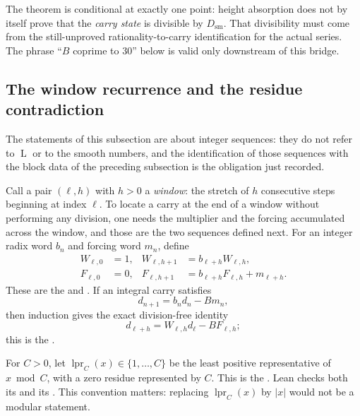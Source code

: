 \documentclass[11pt]{article}
\newcommand{\Lprefix}{\operatorname{L}}
\begin{document}
\noindent The theorem is conditional at exactly one point: height absorption
does not by itself prove that the \emph{carry state} is divisible by
$D_{\mathrm{sm}}$.  That divisibility must come from the still-unproved
rationality-to-carry identification for the actual series.  The phrase
``$B$ coprime to $30$'' below is valid only downstream of this bridge.

\subsection{The window recurrence and the residue contradiction}

The statements of this subsection are about integer sequences: they do not
refer to $\Lprefix$ or to the smooth numbers, and the identification of those
sequences with the block data of the preceding subsection is the obligation
just recorded.

Call a pair $(\ell,h)$ with $h>0$ a \emph{window}: the stretch of $h$
consecutive steps beginning at index $\ell$.  To locate a carry at the end of a
window without performing any division, one needs the multiplier and the
forcing accumulated across the window, and those are the two sequences defined
next.  For an integer radix word $b_n$ and forcing word $m_n$, define
\[
\begin{aligned}
 W_{\ell,0}&=1,
&W_{\ell,h+1}&=b_{\ell+h}W_{\ell,h},\\
 F_{\ell,0}&=0,
&F_{\ell,h+1}&=b_{\ell+h}F_{\ell,h}+m_{\ell+h}.
\end{aligned}
\]
These are the
 and
.
If an integral carry satisfies
\[
 d_{n+1}=b_n d_n-Bm_n ,
\]
then induction gives the exact division-free identity
\[
 d_{\ell+h}=W_{\ell,h}d_\ell-BF_{\ell,h};
\]
this is the
.

For $C>0$, let $\operatorname{lpr}_C(x)\in\{1,\ldots,C\}$ be the least
positive representative of $x\bmod C$, with a zero residue represented by
$C$.  This is the
.  Lean checks both its
 and its
.  This convention matters: replacing
$\operatorname{lpr}_C(x)$ by $|x|$ would not be a modular statement.
\end{document}
